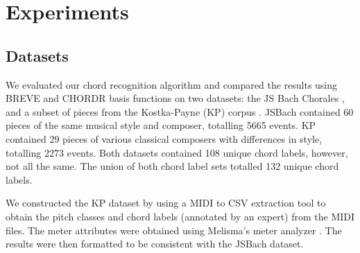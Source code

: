 \documentclass{article} %
\begin{document}
%
%
%
%
%
%
%
%
%
%
%
%
%
%
%
%

\section{Experiments}

\subsection{Datasets}

We evaluated our chord recognition algorithm and compared the results using BREVE and CHORDR basis functions on two datasets: the JS Bach Chorales \cite{coral}, and a subset of pieces from the Kostka-Payne (KP) corpus \cite{kpcorpus}. JSBach contained 60 pieces of the same musical style and composer, totalling 5665 events. KP contained 29 pieces of various classical composers with differences in style, totalling 2273 events. Both datasets contained 108 unique chord labels, however, not all the same. The union of both chord label sets totalled 132 unique chord labels.

We constructed the KP dataset by using a MIDI to CSV extraction tool \cite{midicsv} to obtain the pitch classes and chord labels (annotated by an expert) from the MIDI files. The meter attributes were obtained using Melisma’s meter analyzer \cite{mitpress}. The results were then formatted to be consistent with the JSBach dataset.
\end{document}
